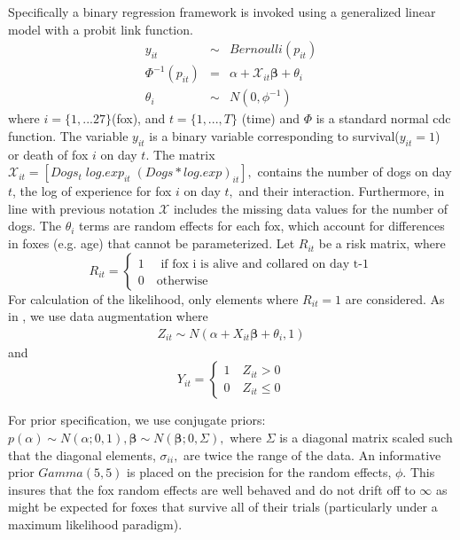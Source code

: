 \documentclass[aoas,preprint]{imsart}
\numberwithin{equation}{section}
\theoremstyle{plain}
\begin{document}
Specifically a binary regression framework is invoked using a generalized linear model with a probit link function.
\begin{eqnarray*}
y_{it} &\sim& Bernoulli(p_{it}) \\
\Phi^{-1}(p_{it}) & = & \alpha + \mathcal{X}_{it}\boldsymbol{\beta} + \theta_{i} \\
\theta_{i} &\sim& N(0, \phi^{-1})
\end{eqnarray*}
where $i = \{1,...27\} $(fox), and $t= \{1,...,T\}$ (time) and $\Phi$ is a standard normal cdc function. The variable $y_{it}$ is a binary variable corresponding to survival($y_{it}=1$) or death of fox $i$ on day $t$. The matrix $\mathcal{X}_{it} = [Dogs_t\; log.exp_{it}\; (Dogs*log.exp)_{it}],$ contains the number of dogs on day $t$, the log of experience for fox $i$ on day $t,$ and their interaction. Furthermore, in line with previous notation $\mathcal{X}$ includes the missing data values for the number of dogs. The $\theta_i$ terms are random effects for each fox, which account for differences in foxes (e.g. age) that cannot be parameterized. Let $R_{it}$ be a risk matrix, where
\[
    R_{it}=\left\{
                \begin{array}{ll}
                  1 \quad \text{ if fox i is alive and collared on day t-1}\\
                  0 \quad \text{otherwise}
                \end{array}
              \right.
  \]
  For calculation of the likelihood, only elements where $R_{it}=1$ are considered. As in \cite{albert}, we use data augmentation where 
  \begin{eqnarray}
  Z_{it} \sim N( \alpha + X_{it}\boldsymbol{\beta} +\theta_{i},1)
  \end{eqnarray}
  and
\[
    Y_{it}=\left\{
                \begin{array}{ll}
                  1 \quad  Z_{it} > 0\\
                  0 \quad Z_{it} \leq 0
                \end{array}
              \right.
  \]

 For prior specification, we use conjugate priors: $p(\alpha) \sim N(\alpha;0,1), \boldsymbol{\beta} \sim N(\boldsymbol{\beta};0,\Sigma),$ where $\Sigma$ is a diagonal matrix scaled such that the diagonal elements, $\sigma_{ii},$ are twice the range of the data. An informative prior $Gamma(5,5)$ is placed on the precision for the random effects, $\phi$. This insures that the fox random effects are well behaved and do not drift off to $\infty$ as might be expected for foxes that survive all of their trials (particularly under a maximum likelihood paradigm). 
\end{document}
